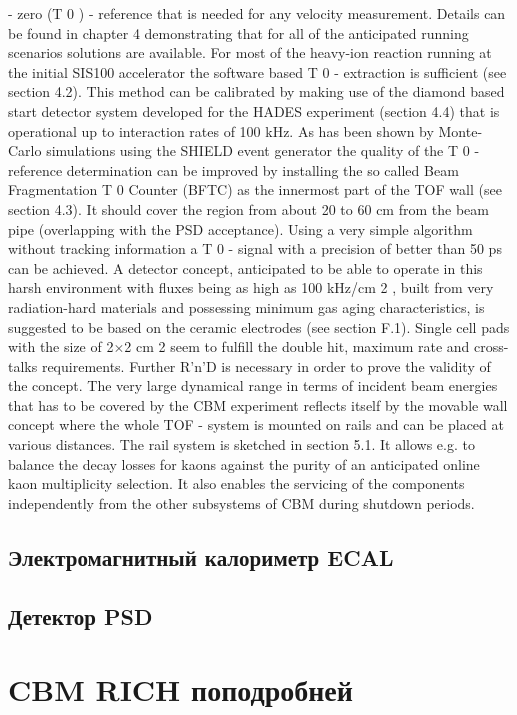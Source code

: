 - zero (T 0 ) - reference that is needed for any velocity measurement. Details can be found in chapter 4
demonstrating that for all of the anticipated running scenarios solutions are available. For most of the
heavy-ion reaction running at the initial SIS100 accelerator the software based T 0 - extraction is sufficient
(see section 4.2). This method can be calibrated by making use of the diamond based start detector
system developed for the HADES experiment (section 4.4) that is operational up to interaction rates of
100 kHz.
As has been shown by Monte-Carlo simulations using the SHIELD event generator the quality of the T 0
- reference determination can be improved by installing the so called Beam Fragmentation T 0 Counter
(BFTC) as the innermost part of the TOF wall (see section 4.3). It should cover the region from about
20 to 60 cm from the beam pipe (overlapping with the PSD acceptance). Using a very simple algorithm
without tracking information a T 0 - signal with a precision of better than 50 ps can be achieved. A detector
concept, anticipated to be able to operate in this harsh environment with fluxes being as high as 100
kHz/cm 2 , built from very radiation-hard materials and possessing minimum gas aging characteristics, is
suggested to be based on the ceramic electrodes (see section F.1). Single cell pads with the size of 2$\times$2
cm 2 seem to fulfill the double hit, maximum rate and cross-talks requirements. Further R'n'D is necessary
in order to prove the validity of the concept.
The very large dynamical range in terms of incident beam energies that has to be covered by the CBM
experiment reflects itself by the movable wall concept where the whole TOF - system is mounted on rails
and can be placed at various distances. The rail system is sketched in section 5.1. It allows e.g. to
balance the decay losses for kaons against the purity of an anticipated online kaon multiplicity selection.
It also enables the servicing of the components independently from the other subsystems of CBM during
shutdown periods.

\subsection{Электромагнитный калориметр ECAL}\label{sec:secECAL}

\subsection{Детектор PSD}\label{sec:secPSD}

\section{CBM RICH поподробней}
